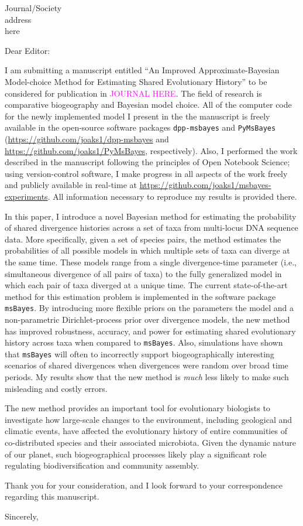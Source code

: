 \documentclass[letterpaper]{letter}
\newcommand{\highLight}[1]{\textcolor{magenta}{\MakeUppercase{#1}}\xspace}
\begin{document}
\begin{letter}{Journal/Society \\
                address \\
                here}
\opening{Dear Editor:}
I am submitting a manuscript entitled ``An Improved Approximate-Bayesian
Model-choice Method for Estimating Shared Evolutionary History'' to be
considered for publication in \highLight{journal here}.
The field of research is comparative biogeography and Bayesian model choice.
All of the computer code for the newly implemented model I present in the
the manuscript is freely available in the open-source
software packages \texttt{dpp-msbayes} and \texttt{PyMsBayes}
(\href{https://github.com/joaks1/dpp-msbayes}{\url{https://github.com/joaks1/dpp-msbayes}}
and
\href{https://github.com/joaks1/PyMsBayes}{\url{https://github.com/joaks1/PyMsBayes}},
respectively).
Also, I performed the work described in the manuscript following the principles
of Open Notebook Science; using version-control software, I make progress in
all aspects of the work freely and publicly available in real-time at
\href{https://github.com/joaks1/msbayes-experiments}{\url{https://github.com/joaks1/msbayes-experiments}}.
All information necessary to reproduce my results is provided there.

In this paper, I introduce a novel Bayesian method for estimating the
probability of shared divergence histories across a set of taxa from
multi-locus DNA sequence data.
More specifically, given a set of species pairs, the method estimates
the probabilities of all possible models in which multiple sets of taxa
can diverge at the same time.
These models range from a single divergence-time parameter (i.e., simultaneous
divergence of all pairs of taxa) to the fully generalized model in which each
pair of taxa diverged at a unique time.
The current state-of-the-art method for this estimation problem is implemented
in the software package \texttt{msBayes}.
By introducing more flexible priors on the parameters the model and a
non-parametric Dirichlet-process prior over divergence models, the new method
has improved robustness, accuracy, and power for estimating shared evolutionary
history across taxa when compared to \texttt{msBayes}.
Also, simulations have shown that \texttt{msBayes} will often to incorrectly
support biogeographically interesting scenarios of shared divergences when
divergences were random over broad time periods.
My results show that the new method is \emph{much} less likely to make such
misleading and costly errors.

The new method provides an important tool for evolutionary biologists to
investigate how large-scale changes to the environment, including geological
and climatic events, have affected the evolutionary history of entire
communities of co-distributed species and their associated microbiota.
Given the dynamic nature of our planet, such biogeographical processes likely
play a significant role regulating biodiversification and community assembly.

Thank you for your consideration, and I look forward to your correspondence
regarding this manuscript.

\addtolength{\medskipamount}{-5pt}
\closing{Sincerely,}
\end{letter}
\end{document}

